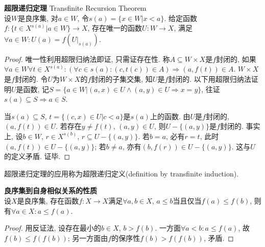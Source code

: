 \begin{thm} \textbf{超限递归定理} Transfinite Recursion Theorem\\
设$W$是良序集, 对$a\in W$, 令$s(a)=\{x\in W\vert x<a\}$. 给定函数$f:\{t\in X^{s(a)}\vert a\in W\}\to X$, 存在唯一的函数$U:W\to X$, 满足$\forall a\in W: U(a)=f(U|_{s(a)})$.
\end{thm}
\begin{proof}
唯一性利用超限归纳法即证, 只需证存在性. 称$A\subseteq W\times X$是$f$封闭的, 如果$\forall a\in W \forall t\in X^{s(a)}: (\forall c\in s(a): (c,t(c))\in A )\Rightarrow (a,f(t))\in A$. $W\times X$是$f$封闭的. 令$U$为$W\times X$的$f$封闭的子集交集, 知$U$是$f$封闭的. 以下用超限归纳法证明$U$是函数, 记$S=\{a\in W\vert (a,x)\in U\land (a,y)\in U\Rightarrow x=y\}$, 往证$s(a)\subseteq  S\Rightarrow a\in S$. 
\par 当$s(a)\subseteq S$, $t=\{(c,x)\in U\vert c<a\}$是$s(a)$上的函数. 由$U$是$f$封闭的, $(a,f(t))\in U$. 若存在$y\neq f(t)$, $(a,y)\in U$, 则$U-\{(a,y)\}$是$f$封闭的. 事实上, 设$b\in W$, $r\in X^{s(b)}$, $r\subseteq U-\{(a,y)\}$. 若$b=a$, 必有$r=t$, 此时$(a,f(t))\in U-\{(a,y)\}$; 若$b\neq a$, 亦有$(b,f(r))\in U-\{(a,y)\}$. 这与$U$的定义矛盾. 证毕. 
\end{proof}
\par 超限递归定理的应用称为超限递归定义(definition by transfinite induction).  

\begin{lem}\textbf{良序集到自身相似关系的性质}\\
设$X$是良序集, 存在函数$f:X\to X$满足$\forall a,b\in X$, $a\le b$当且仅当$f(a)\le f(b)$, 则有$\forall a\in X: a\le f(a)$. 
\label{lem:wossim}
\end{lem}
\begin{proof}
用反证法, 设存在最小的$b\in X$, $b>f(b)$. 一方面$\forall a<b: a\le f(a)$, 故$f(b)\le f(f(b))$; 另一方面由$f$的保序性$f(b)>f(f(b))$, 矛盾. 
\end{proof}

